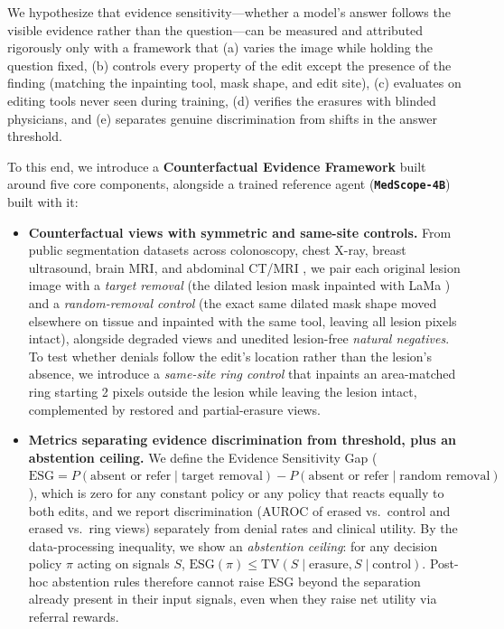 \documentclass{article} %
\begin{document}
We hypothesize that evidence sensitivity---whether a model's answer follows the visible evidence rather than the question---can be measured and attributed rigorously only with a framework that (a) varies the image while holding the question fixed, (b) controls every property of the edit except the presence of the finding (matching the inpainting tool, mask shape, and edit site), (c) evaluates on editing tools never seen during training, (d) verifies the erasures with blinded physicians, and (e) separates genuine discrimination from shifts in the answer threshold.

To this end, we introduce a \textbf{Counterfactual Evidence Framework} built around five core components, alongside a trained reference agent (\textbf{\texttt{MedScope-4B}}) built with it:
\begin{itemize}[leftmargin=*,nosep]
    \item \textbf{Counterfactual views with symmetric and same-site controls.} From public segmentation datasets across colonoscopy, chest X-ray, breast ultrasound, brain MRI, and abdominal CT/MRI \citep{liu2021slake,jha2020kvasir,borgli2020hyperkvasir,liu2020chestxdet,al2020dataset,buda2019association}, we pair each original lesion image with a \emph{target removal} (the dilated lesion mask inpainted with LaMa \citep{suvorov2022lama}) and a \emph{random-removal control} (the exact same dilated mask shape moved elsewhere on tissue and inpainted with the same tool, leaving all lesion pixels intact), alongside degraded views and unedited lesion-free \emph{natural negatives}. To test whether denials follow the edit's location rather than the lesion's absence, we introduce a \emph{same-site ring control} that inpaints an area-matched ring starting 2 pixels outside the lesion while leaving the lesion intact, complemented by restored and partial-erasure views.
    \item \textbf{Metrics separating evidence discrimination from threshold, plus an abstention ceiling.} We define the Evidence Sensitivity Gap ($\text{ESG} = P(\text{absent or refer} \mid \text{target removal}) - P(\text{absent or refer} \mid \text{random removal})$), which is zero for any constant policy or any policy that reacts equally to both edits, and we report discrimination (AUROC of erased vs.\ control and erased vs.\ ring views) separately from denial rates and clinical utility. By the data-processing inequality, we show an \emph{abstention ceiling}: for any decision policy $\pi$ acting on signals $S$, $\text{ESG}(\pi) \le \text{TV}(S \mid \text{erasure}, S \mid \text{control})$. Post-hoc abstention rules therefore cannot raise ESG beyond the separation already present in their input signals, even when they raise net utility via referral rewards.

\end{itemize}
\end{document}
